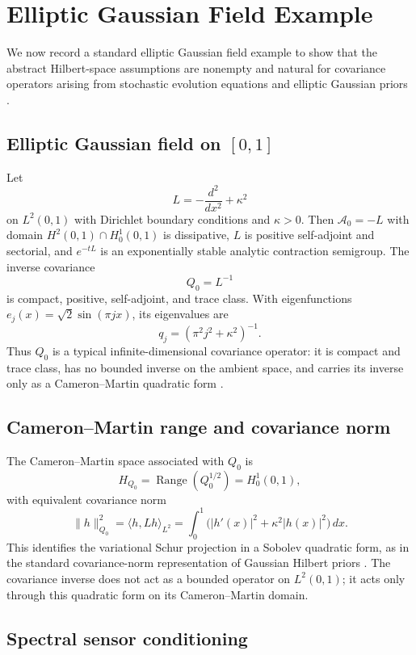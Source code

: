 \documentclass[11pt]{amsart}
\theoremstyle{plain}
\theoremstyle{definition}
\theoremstyle{remark}
\begin{document}
\section{Elliptic Gaussian Field Example}
\label{sec:spde}

We now record a standard elliptic Gaussian field example to show that the abstract Hilbert-space assumptions are nonempty and natural for covariance operators arising from stochastic evolution equations and elliptic Gaussian priors \cite{daprato2014stochastic,lord2014introduction,stuart2010inverse}.

\subsection{Elliptic Gaussian field on $[0,1]$}

Let
\[
  L=-\frac{d^2}{dx^2}+\kappa^2
\]
on $L^2(0,1)$ with Dirichlet boundary conditions and $\kappa>0$. Then $\mathcal{A}_0=-L$ with domain $H^2(0,1)\cap H_0^1(0,1)$ is dissipative, $L$ is positive self-adjoint and sectorial, and $e^{-tL}$ is an exponentially stable analytic contraction semigroup. The inverse covariance
\[
  Q_0=L^{-1}
\]
is compact, positive, self-adjoint, and trace class. With eigenfunctions $e_j(x)=\sqrt{2}\sin(\pi jx)$, its eigenvalues are
\[
  q_j=(\pi^2j^2+\kappa^2)^{-1}.
\]
Thus $Q_0$ is a typical infinite-dimensional covariance operator: it is compact and trace class, has no bounded inverse on the ambient space, and carries its inverse only as a Cameron--Martin quadratic form \cite{bogachev1998gaussian,simon2005trace}.

\subsection{Cameron--Martin range and covariance norm}

The Cameron--Martin space associated with $Q_0$ is
\[
  H_{Q_0}=\operatorname{Range}(Q_0^{1/2})=H_0^1(0,1),
\]
with equivalent covariance norm
\[
  \|h\|_{Q_0}^2
  =\langle h,Lh\rangle_{L^2}
  =\int_0^1 \bigl(|h'(x)|^2+\kappa^2|h(x)|^2\bigr)\,dx.
\]
This identifies the variational Schur projection in a Sobolev quadratic form, as in the standard covariance-norm representation of Gaussian Hilbert priors \cite{bogachev1998gaussian,stuart2010inverse}. The covariance inverse does not act as a bounded operator on $L^2(0,1)$; it acts only through this quadratic form on its Cameron--Martin domain.

\subsection{Spectral sensor conditioning}
\end{document}
